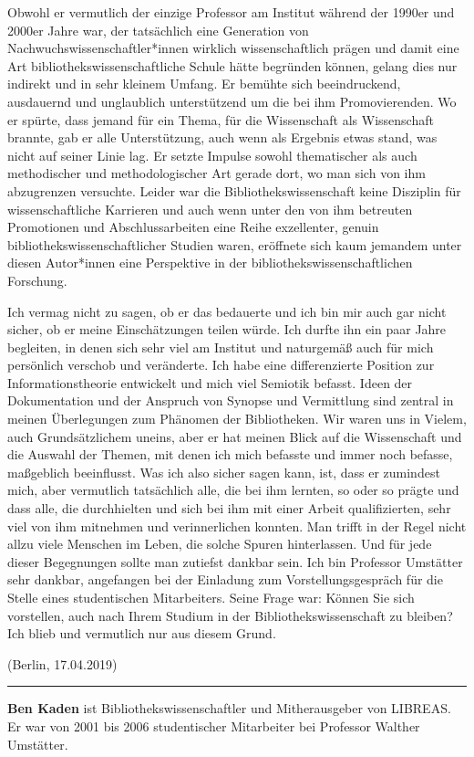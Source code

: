 \documentclass[a4paper,
fontsize=11pt,
oneside,
numbers=noperiodatend,
parskip=half-,
bibliography=totoc,
final
]{scrartcl}
\begin{document}
Obwohl er vermutlich der einzige Professor am Institut während der
1990er und 2000er Jahre war, der tatsächlich eine Generation von
Nachwuchswissenschaftler*innen wirklich wissenschaftlich prägen und
damit eine Art bibliothekswissenschaftliche Schule hätte begründen
können, gelang dies nur indirekt und in sehr kleinem Umfang. Er bemühte
sich beeindruckend, ausdauernd und unglaublich unterstützend um die bei
ihm Promovierenden. Wo er spürte, dass jemand für ein Thema, für die
Wissenschaft als Wissenschaft brannte, gab er alle Unterstützung, auch
wenn als Ergebnis etwas stand, was nicht auf seiner Linie lag. Er setzte
Impulse sowohl thematischer als auch methodischer und methodologischer
Art gerade dort, wo man sich von ihm abzugrenzen versuchte. Leider war
die Bibliothekswissenschaft keine Disziplin für wissenschaftliche
Karrieren und auch wenn unter den von ihm betreuten Promotionen und
Abschlussarbeiten eine Reihe exzellenter, genuin
bibliothekswissenschaftlicher Studien waren, eröffnete sich kaum
jemandem unter diesen Autor*innen eine Perspektive in der
bibliothekswissenschaftlichen Forschung.

Ich vermag nicht zu sagen, ob er das bedauerte und ich bin mir auch gar
nicht sicher, ob er meine Einschätzungen teilen würde. Ich durfte ihn
ein paar Jahre begleiten, in denen sich sehr viel am Institut und
naturgemäß auch für mich persönlich verschob und veränderte. Ich habe
eine differenzierte Position zur Informationstheorie entwickelt und mich
viel Semiotik befasst. Ideen der Dokumentation und der Anspruch von
Synopse und Vermittlung sind zentral in meinen Überlegungen zum Phänomen
der Bibliotheken. Wir waren uns in Vielem, auch Grundsätzlichem uneins,
aber er hat meinen Blick auf die Wissenschaft und die Auswahl der
Themen, mit denen ich mich befasste und immer noch befasse, maßgeblich
beeinflusst. Was ich also sicher sagen kann, ist, dass er zumindest
mich, aber vermutlich tatsächlich alle, die bei ihm lernten, so oder so
prägte und dass alle, die durchhielten und sich bei ihm mit einer Arbeit
qualifizierten, sehr viel von ihm mitnehmen und verinnerlichen konnten.
Man trifft in der Regel nicht allzu viele Menschen im Leben, die solche
Spuren hinterlassen. Und für jede dieser Begegnungen sollte man zutiefst
dankbar sein. Ich bin Professor Umstätter sehr dankbar, angefangen bei
der Einladung zum Vorstellungsgespräch für die Stelle eines
studentischen Mitarbeiters. Seine Frage war: Können Sie sich vorstellen,
auch nach Ihrem Studium in der Bibliothekswissenschaft zu bleiben? Ich
blieb und vermutlich nur aus diesem Grund.

(Berlin, 17.04.2019)

\begin{center}\rule{0.5\linewidth}{\linethickness}\end{center}

\textbf{Ben Kaden} ist Bibliothekswissenschaftler und Mitherausgeber von
LIBREAS. Er war von 2001 bis 2006 studentischer Mitarbeiter bei
Professor Walther Umstätter.
\end{document}
